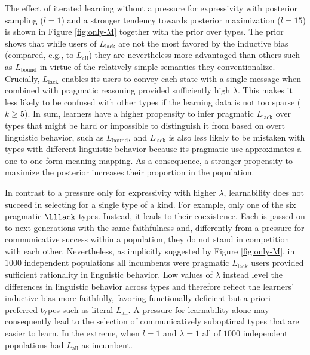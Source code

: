 \documentclass[a4paper]{article}
\newcommand{\mylang}[1]{\ensuremath{L_{\text{#1}}}\xspace} %
\newcommand{\Lall}{\mylang{all}}
\newcommand{\Lbound}{\mylang{bound}}
\newcommand{\Llack}{\mylang{lack}}
\begin{document}
The effect of iterated learning without a pressure for expressivity with posterior sampling ($l = 1$) and a stronger tendency towards posterior maximization ($l = 15$) is shown in Figure \ref{fig:only-M} together with the prior over types. The prior shows that while users of $\Llack$ are not the most favored by the inductive bias (compared, e.g., to $\Lall$) they are nevertheless more advantaged than others such as $\Lbound$ in virtue of the relatively simple semantics they conventionalize. Crucially, $\Llack$ enables its users to convey each state with a single message when combined with pragmatic reasoning provided sufficiently high $\lambda$. This makes it less likely to be confused with other types if the learning data is not too sparse ($k \geq 5$). In sum, learners have a higher propensity to infer pragmatic $\Llack$ over types that might be hard or impossible to distinguish it from based on overt linguistic behavior, such as $\Lbound$, and $\Llack$ is also less likely to be mistaken with types with different linguistic behavior because its pragmatic use approximates a one-to-one form-meaning mapping. As a consequence, a stronger propensity to maximize the posterior increases their proportion in the population. 

In contrast to a pressure only for expressivity with higher $\lambda$, learnability does not succeed in selecting for a single type of a kind. For example, only one of the six pragmatic $\Lllack$ types. Instead, it leads to their coexistence. Each is passed on to next generations with the same faithfulness and, differently from a pressure for communicative success within a population, they do not stand in competition with each other. Nevertheless, as implicitly suggested by Figure \ref{fig:only-M}, in $1000$ independent populations all incumbents were pragmatic $\Llack$ users provided sufficient rationality in linguistic behavior. Low values of $\lambda$ instead level the differences in linguistic behavior across types and therefore reflect the learners' inductive bias more faithfully, favoring functionally deficient but a priori preferred types such as literal $\Lall$. A pressure for learnability alone may consequently lead to the selection of communicatively suboptimal types that are easier to learn. In the extreme, when $l = 1$ and $\lambda = 1$ all of $1000$ independent populations had $\Lall$ as incumbent.
\end{document}

